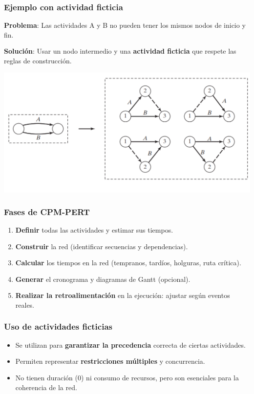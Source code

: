 \documentclass{beamer}
\begin{document}
\begin{frame}
\frametitle{Ejemplo con actividad ficticia}

\textbf{Problema}: Las actividades A y B no pueden tener los mismos nodos de inicio y fin.

\textbf{Solución}: Usar un nodo intermedio y una \textbf{actividad ficticia} que respete las reglas de construcción.

\begin{center}
\includegraphics[scale=0.3]{images/actividad_ficticia.png}
\end{center}

\end{frame}

\begin{frame}
\frametitle{Fases de CPM-PERT}

\begin{enumerate}
    \item \textbf{Definir} todas las actividades y estimar sus tiempos.
    \item \textbf{Construir} la red (identificar secuencias y dependencias).
    \item \textbf{Calcular} los tiempos en la red (tempranos, tardíos, holguras, ruta crítica).
    \item \textbf{Generar} el cronograma y diagramas de Gantt (opcional).
    \item \textbf{Realizar la retroalimentación} en la ejecución: ajustar según eventos reales.
\end{enumerate}

\end{frame}

\begin{frame}
\frametitle{Uso de actividades ficticias}

\begin{itemize}
    \item Se utilizan para \textbf{garantizar la precedencia} correcta de ciertas actividades.
    \item Permiten representar \textbf{restricciones múltiples} y concurrencia.
    \item No tienen duración (0) ni consumo de recursos, pero son esenciales para la coherencia de la red.
\end{itemize}

\end{frame}
\end{document}
